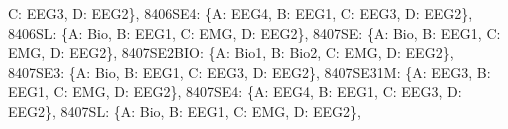 \documentclass[letterpaper,10pt,english]{sphinxmanual}
\begin{document}
\begin{fulllineitems}
\begin{fulllineitems}
\textquotesingle{}C\textquotesingle{}: \textquotesingle{}EEG3\textquotesingle{}, \textquotesingle{}D\textquotesingle{}: \textquotesingle{}EEG2\textquotesingle{}\}, \textquotesingle{}8406\sphinxhyphen{}SE4\textquotesingle{}: \{\textquotesingle{}A\textquotesingle{}: \textquotesingle{}EEG4\textquotesingle{}, \textquotesingle{}B\textquotesingle{}: \textquotesingle{}EEG1\textquotesingle{}, \textquotesingle{}C\textquotesingle{}: \textquotesingle{}EEG3\textquotesingle{}, \textquotesingle{}D\textquotesingle{}: \textquotesingle{}EEG2\textquotesingle{}\}, \textquotesingle{}8406\sphinxhyphen{}SL\textquotesingle{}: \{\textquotesingle{}A\textquotesingle{}: \textquotesingle{}Bio\textquotesingle{}, \textquotesingle{}B\textquotesingle{}: \textquotesingle{}EEG1\textquotesingle{}, \textquotesingle{}C\textquotesingle{}: \textquotesingle{}EMG\textquotesingle{}, \textquotesingle{}D\textquotesingle{}: \textquotesingle{}EEG2\textquotesingle{}\}, \textquotesingle{}8407\sphinxhyphen{}SE\textquotesingle{}: \{\textquotesingle{}A\textquotesingle{}: \textquotesingle{}Bio\textquotesingle{}, \textquotesingle{}B\textquotesingle{}: \textquotesingle{}EEG1\textquotesingle{}, \textquotesingle{}C\textquotesingle{}: \textquotesingle{}EMG\textquotesingle{}, \textquotesingle{}D\textquotesingle{}: \textquotesingle{}EEG2\textquotesingle{}\}, \textquotesingle{}8407\sphinxhyphen{}SE\sphinxhyphen{}2BIO\textquotesingle{}: \{\textquotesingle{}A\textquotesingle{}: \textquotesingle{}Bio1\textquotesingle{}, \textquotesingle{}B\textquotesingle{}: \textquotesingle{}Bio2\textquotesingle{}, \textquotesingle{}C\textquotesingle{}: \textquotesingle{}EMG\textquotesingle{}, \textquotesingle{}D\textquotesingle{}: \textquotesingle{}EEG2\textquotesingle{}\}, \textquotesingle{}8407\sphinxhyphen{}SE3\textquotesingle{}: \{\textquotesingle{}A\textquotesingle{}: \textquotesingle{}Bio\textquotesingle{}, \textquotesingle{}B\textquotesingle{}: \textquotesingle{}EEG1\textquotesingle{}, \textquotesingle{}C\textquotesingle{}: \textquotesingle{}EEG3\textquotesingle{}, \textquotesingle{}D\textquotesingle{}: \textquotesingle{}EEG2\textquotesingle{}\}, \textquotesingle{}8407\sphinxhyphen{}SE31M\textquotesingle{}: \{\textquotesingle{}A\textquotesingle{}: \textquotesingle{}EEG3\textquotesingle{}, \textquotesingle{}B\textquotesingle{}: \textquotesingle{}EEG1\textquotesingle{}, \textquotesingle{}C\textquotesingle{}: \textquotesingle{}EMG\textquotesingle{}, \textquotesingle{}D\textquotesingle{}: \textquotesingle{}EEG2\textquotesingle{}\}, \textquotesingle{}8407\sphinxhyphen{}SE4\textquotesingle{}: \{\textquotesingle{}A\textquotesingle{}: \textquotesingle{}EEG4\textquotesingle{}, \textquotesingle{}B\textquotesingle{}: \textquotesingle{}EEG1\textquotesingle{}, \textquotesingle{}C\textquotesingle{}: \textquotesingle{}EEG3\textquotesingle{}, \textquotesingle{}D\textquotesingle{}: \textquotesingle{}EEG2\textquotesingle{}\}, \textquotesingle{}8407\sphinxhyphen{}SL\textquotesingle{}: \{\textquotesingle{}A\textquotesingle{}: \textquotesingle{}Bio\textquotesingle{}, \textquotesingle{}B\textquotesingle{}: \textquotesingle{}EEG1\textquotesingle{}, \textquotesingle{}C\textquotesingle{}: \textquotesingle{}EMG\textquotesingle{}, \textquotesingle{}D\textquotesingle{}: \textquotesingle{}EEG2\textquotesingle{}\}, 
\end{fulllineitems}
\end{fulllineitems}
\end{document}
